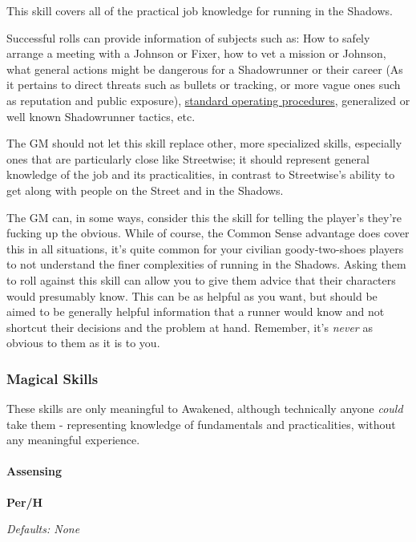 \begin{multicols*}{3}
	This skill covers all of the practical job knowledge for running in the Shadows. 
	
	Successful rolls can provide information of subjects such as: How to safely arrange a meeting with a Johnson or Fixer, how to vet a mission or Johnson, what general actions might be dangerous for a Shadowrunner or their career (As it pertains to direct threats such as bullets or tracking, or more vague ones such as reputation and public exposure), \textcolor{Blue}{\href{https://docs.google.com/document/d/1ydfYWrtSEOtMoSOpVesdoS2iJw_fOHHDZA1RMCXlY8Y/edit?usp=drivesdk}{standard operating procedures}}, generalized or well known Shadowrunner tactics, etc.
	
	The GM should not let this skill replace other, more specialized skills, especially ones that are particularly close like Streetwise; it should represent general knowledge of the job and its practicalities, in contrast to Streetwise's ability to get along with people on the Street and in the Shadows.
	
	The GM can, in some ways, consider this the skill for telling the player's they're fucking up the obvious. While of course, the Common Sense advantage does cover this in all situations, it's quite common for your civilian goody-two-shoes players to not understand the finer complexities of running in the Shadows. Asking them to roll against this skill can allow you to give them advice that their characters would presumably know. This can be as helpful as you want, but should be aimed to be generally helpful information that a runner would know and not shortcut their decisions and the problem at hand. Remember, it's \textit{never} as obvious to them as it is to you.
	
	\subsubsection*{Magical Skills}
	
	These skills are only meaningful to Awakened, although technically anyone \textit{could} take them - representing knowledge of fundamentals and practicalities, without any meaningful experience.
	
	\paragraph{Assensing}\label{assensing_skill}
	\begin{flushright}
		\textbf{Per/H}
	\end{flushright}
	\textcolor{NavyBlue}{\textit{Defaults: None}}
	

\end{multicols*}
